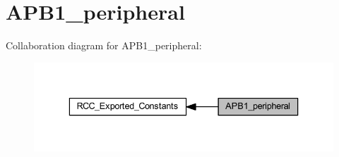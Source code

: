 \hypertarget{group___a_p_b1__peripheral}{}\section{A\+P\+B1\+\_\+peripheral}
\label{group___a_p_b1__peripheral}
Collaboration diagram for A\+P\+B1\+\_\+peripheral\+:
\nopagebreak
\begin{figure}[H]
\begin{center}
\leavevmode
\includegraphics[width=336pt]{group___a_p_b1__peripheral}
\end{center}
\end{figure}
